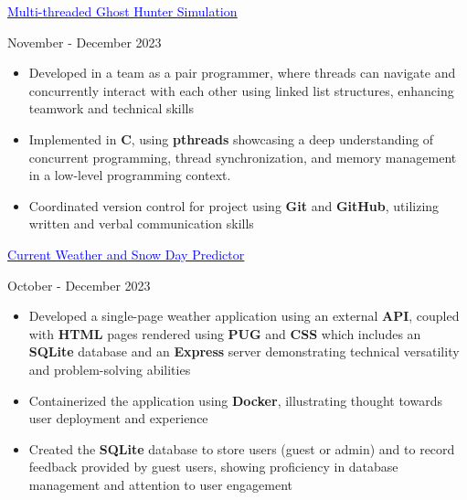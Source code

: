 \documentclass[a4paper,11pt]{article}
\begin{document}
\begin{minipage}{.65\linewidth}
     \href{https://github.com/JeremyFriesenGitHub/Multi-threaded-Ghost-Hunter-Simulation}{\textcolor{blue}{\uline{Multi-threaded Ghost Hunter Simulation}}}
 \end{minipage}
 \hfill %
 \begin{minipage}{.34\linewidth}
     \flushright
     November - December 2023
 \end{minipage}
 \begin{minipage}{\linewidth}
 \vspace{10pt}
 \begin{itemize}
     \item Developed in a team as a pair programmer, where threads can navigate and concurrently interact with each other using linked list structures, enhancing teamwork and technical skills
     \item Implemented in \textbf{C}, using \textbf{pthreads} showcasing a deep understanding of concurrent programming, thread synchronization, and memory management in a low-level programming context.
     \item Coordinated version control for project using \textbf{Git} and \textbf{GitHub}, utilizing written and verbal communication skills 
      \end{itemize}
        \vspace{1pt}
 \end{minipage}
\begin{minipage}{.65\linewidth}
\href{https://github.com/JeremyFriesenGitHub/Weather-App-and-Snow-day-Project}{\textcolor{blue}{\uline{Current Weather and Snow Day Predictor}}}                
\end{minipage}
\hfill
\begin{minipage}{.34\linewidth}
    \flushright
    October - December 2023
\end{minipage}
\begin{minipage}{\linewidth}
\vspace{10pt}
\begin{itemize}
    \item Developed a single-page weather application using an external \textbf{API}, coupled with \textbf{HTML} pages rendered using \textbf{PUG} and \textbf{CSS} which includes an \textbf{SQLite} database and an \textbf{Express} server demonstrating technical versatility and problem-solving abilities
    \item Containerized the application using \textbf{Docker}, illustrating thought towards user deployment and experience
    \item Created the \textbf{SQLite} database to store users (guest or admin) and to record feedback provided by guest users, showing proficiency in database management and attention to user engagement
  \end{itemize}
  \vspace{1pt}
\end{minipage}
\end{document}
